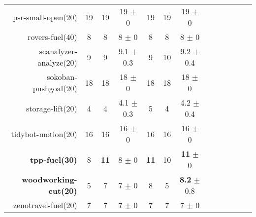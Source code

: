 \begin{center}
\begin{tabular}{|r|*{4}{ccc|}}
psr-small-open(20) & 19 & 19 & 19 $\pm$ 0 & 19 & 19 & 19 $\pm$ 0\\
rovers-fuel(40) & 8 & 8 & 8 $\pm$ 0 & 8 & 8 & 8 $\pm$ 0\\
scanalyzer-analyze(20) & 9 & 9 & 9.1 $\pm$ 0.3 & 9 & 10 & 9.2 $\pm$ 0.4\\
sokoban-pushgoal(20) & 18 & 18 & 18 $\pm$ 0 & 18 & 18 & 18 $\pm$ 0\\
storage-lift(20) & 4 & 4 & 4.1 $\pm$ 0.3 & 5 & 4 & 4.2 $\pm$ 0.4\\
tidybot-motion(20) & 16 & 16 & 16 $\pm$ 0 & 16 & 16 & 16 $\pm$ 0\\
\textbf{tpp-fuel(30)} & 8 & \textbf{11} & 8 $\pm$ 0 & \textbf{11} & 10 & \textbf{11} $\pm$ 0\\
\textbf{woodworking-cut(20)} & 5 & 7 & 7 $\pm$ 0 & 8 & 5 & \textbf{8.2} $\pm$ 0.8\\
zenotravel-fuel(20) & 7 & 7 & 7 $\pm$ 0 & 7 & 7 & 7 $\pm$ 0\\
\end{tabular}
\end{center}
